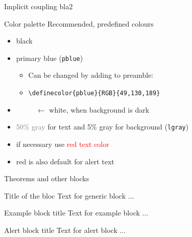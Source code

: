 \documentclass[10pt,t]{beamer}
\begin{document}
\begin{frame}{Implicit coupling}
  bla2
  \hyperlink{coupling}{\beamerreturnbutton{}}
\end{frame}



\begin{frame}{Color palette}\label{colorpalette}
Recommended, predefined colours
\begin{itemize}
	\item black
	\item \textcolor{pblue}{primary blue} (\texttt{pblue})
	\begin{itemize}
	    \item Can be changed by adding to preamble:
	    \item[ ] \texttt{\textbackslash definecolor\{pblue\}\{RGB\}\{49,130,189\}}
	\end{itemize}
	\item \textcolor{white}{white} $\leftarrow$ white, when background is dark
	\item \textcolor{gray}{50\% gray } for text and \textcolor{lgray}{5\% gray} for background (\texttt{lgray})

	\vspace{5mm}
	\item if necessary use \textcolor{red}{red text color}  
	\item red is also default for \alert{alert text}
\end{itemize}
\end{frame} 



\begin{frame}{Theorems and other blocks}
	\begin{block}{Title of the bloc}
	Text for generic block ...
	\end{block}

\vspace{11pt}
	\begin{exampleblock}{Example block title}
	Text for example block ...
	\end{exampleblock}

\vspace{11pt}
	\begin{alertblock}{Alert block title}
	Text for alert block ...
	\end{alertblock}
\end{frame}
\end{document}
